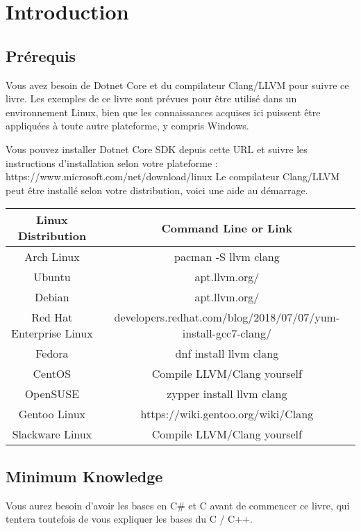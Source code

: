 \chapter{Introduction}
\section{Prérequis}
Vous avez besoin de Dotnet Core et du compilateur Clang/LLVM pour suivre ce livre. Les exemples de ce livre sont prévues pour être utilisé dans un environnement Linux, bien que les connaissances acquises ici puissent être appliquées à toute autre plateforme, y compris Windows.

Vous pouvez installer Dotnet Core SDK depuis cette URL et suivre les instructions d'installation selon votre plateforme :
\newline \newline
 https://www.microsoft.com/net/download/linux
\newline \newline
Le compilateur Clang/LLVM peut être installé selon votre distribution, voici une aide au démarrage.
\newline \newline
\begin{tabular}{| c | c |}
	\hline 
	\textbf{Linux Distribution} & \textbf{Command Line or Link} \\
	\hline
	 Arch Linux & pacman -S llvm clang  \\
	 \hline
	 Ubuntu & apt.llvm.org/ \\
	 \hline
	 Debian & apt.llvm.org/ \\
	 \hline
	 Red Hat Enterprise Linux & developers.redhat.com/blog/2018/07/07/yum-install-gcc7-clang/ \\
	 \hline
	 Fedora & dnf install llvm clang \\
	 \hline
	 CentOS & Compile LLVM/Clang yourself  \shrug \\
	 \hline
	 OpenSUSE & zypper install llvm clang \\
	 \hline
	 Gentoo Linux & https://wiki.gentoo.org/wiki/Clang \\
	 \hline
	 Slackware Linux & Compile LLVM/Clang yourself  \shrug \\
	 \hline
\end{tabular}

\section{Minimum Knowledge}
Vous aurez besoin d'avoir les bases en C# et C avant de commencer ce livre, qui tentera toutefois de vous expliquer les bases du C / C++.